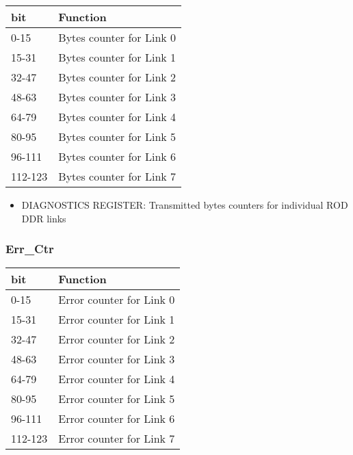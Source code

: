 \begin {table}[H]
\begin{center}
\begin{tabular}{|l|l|}
\hline
\textbf{bit} & \textbf{Function} \\
\hline
0-15 & Bytes counter for Link 0 \\
\hline
15-31 & Bytes counter for Link 1 \\
\hline
32-47 & Bytes counter for Link 2 \\
\hline
48-63 & Bytes counter for Link 3 \\
\hline
64-79 & Bytes counter for Link 4 \\
\hline
80-95 & Bytes counter for Link 5 \\
\hline
96-111 & Bytes counter for Link 6 \\
\hline
112-123 & Bytes counter for Link 7 \\
\hline
\end{tabular}
\end{center}
\end{table}


\begin{itemize}
\item DIAGNOSTICS REGISTER: Transmitted bytes counters for individual ROD DDR links
\end{itemize}



\subsubsection{Err\_Ctr}

\begin {table}[H]
\begin{center}
\begin{tabular}{|l|l|}
\hline
\textbf{bit} & \textbf{Function} \\
\hline
0-15 & Error counter for Link 0 \\
\hline
15-31 & Error counter for Link 1 \\
\hline
32-47 & Error counter for Link 2 \\
\hline
48-63 & Error counter for Link 3 \\
\hline
64-79 & Error counter for Link 4 \\
\hline
80-95 & Error counter for Link 5 \\
\hline
96-111 & Error counter for Link 6 \\
\hline
112-123 & Error counter for Link 7 \\
\hline
\end{tabular}
\end{center}
\end{table}


